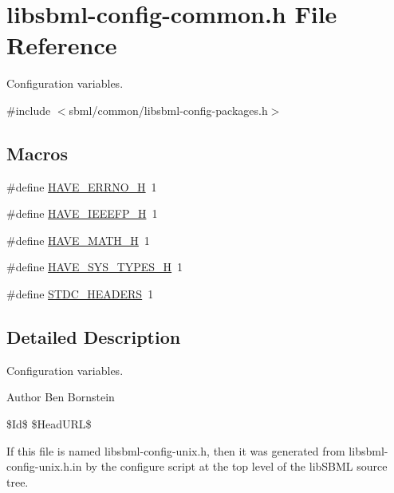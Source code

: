\hypertarget{libsbml-config-common_8h}{}\section{libsbml-\/config-\/common.h File Reference}
\label{libsbml-config-common_8h}


Configuration variables.  


{\ttfamily \#include $<$sbml/common/libsbml-\/config-\/packages.\+h$>$}\newline
\subsection*{Macros}
\begin{DoxyCompactItemize}
\item 
\#define \hyperlink{libsbml-config-common_8h_ae655a511fd230d2fd6b99ff2801df201}{H\+A\+V\+E\+\_\+\+E\+R\+R\+N\+O\+\_\+H}~1
\item 
\#define \hyperlink{libsbml-config-common_8h_ac72000aa2a629426f49e18a21fcb5e76}{H\+A\+V\+E\+\_\+\+I\+E\+E\+E\+F\+P\+\_\+H}~1
\item 
\#define \hyperlink{libsbml-config-common_8h_ac5d002420ef5a309454cc6c81128850a}{H\+A\+V\+E\+\_\+\+M\+A\+T\+H\+\_\+H}~1
\item 
\#define \hyperlink{libsbml-config-common_8h_a69dc70bea5d1f8bd2be9740e974fa666}{H\+A\+V\+E\+\_\+\+S\+Y\+S\+\_\+\+T\+Y\+P\+E\+S\+\_\+H}~1
\item 
\#define \hyperlink{libsbml-config-common_8h_a550e5c272cc3cf3814651721167dcd23}{S\+T\+D\+C\+\_\+\+H\+E\+A\+D\+E\+RS}~1
\end{DoxyCompactItemize}


\subsection{Detailed Description}
Configuration variables. 

\begin{DoxyAuthor}{Author}
Ben Bornstein
\end{DoxyAuthor}
\$\+Id\$ \$\+Head\+U\+RL\$

If this file is named {\ttfamily libsbml-\/config-\/unix.\+h}, then it was generated from {\ttfamily libsbml-\/config-\/unix.\+h.\+in} by the {\ttfamily configure} script at the top level of the lib\+S\+B\+ML source tree.

